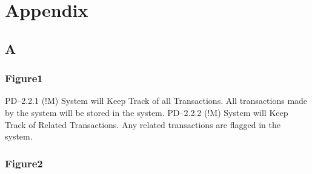 \chapter{Appendix}
\label{appendix}

\section{A}
\label{a}

\subsection{Figure1}
\label{figure1}

PD--2.2.1 (!M) System will Keep Track of all Transactions.
All transactions made by the system will be stored in the system.
PD--2.2.2 (!M) System will Keep Track of Related Transactions.
Any related transactions are flagged in the system.

\subsection{Figure2}
\label{figure2}

